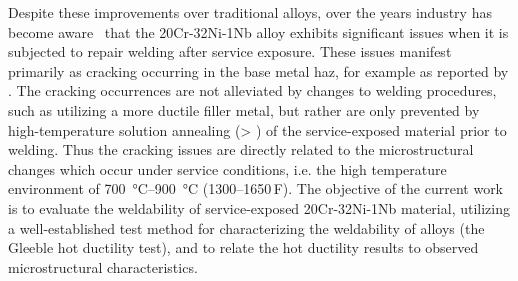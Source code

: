 Despite these improvements over traditional alloys, over the years industry has become aware~\cite{api_942_2014} that the 20Cr-32Ni-1Nb alloy exhibits significant issues when it is subjected to repair welding after service exposure. These issues manifest primarily as cracking occurring in the base metal \gls{haz}, for example as reported by \citet{hoffman_weld_1998}. The cracking occurrences are not alleviated by changes to welding procedures, such as utilizing a more ductile filler metal, but rather are only prevented by high-temperature solution annealing (> ) of the service-exposed material prior to welding. Thus the cracking issues are directly related to the microstructural changes which occur under service conditions, i.e. the high temperature environment of \SIrange[range-phrase=--]{700}{900}{\degreeCelsius} (\numrange[range-phrase=--]{1300}{1650}\,\textdegree{}F). The objective of the current work is to evaluate the weldability of service-exposed 20Cr-32Ni-1Nb material, utilizing a well-established test method for characterizing the weldability of alloys (the Gleeble\textregistered{} hot ductility test), and to relate the hot ductility results to observed microstructural characteristics.












